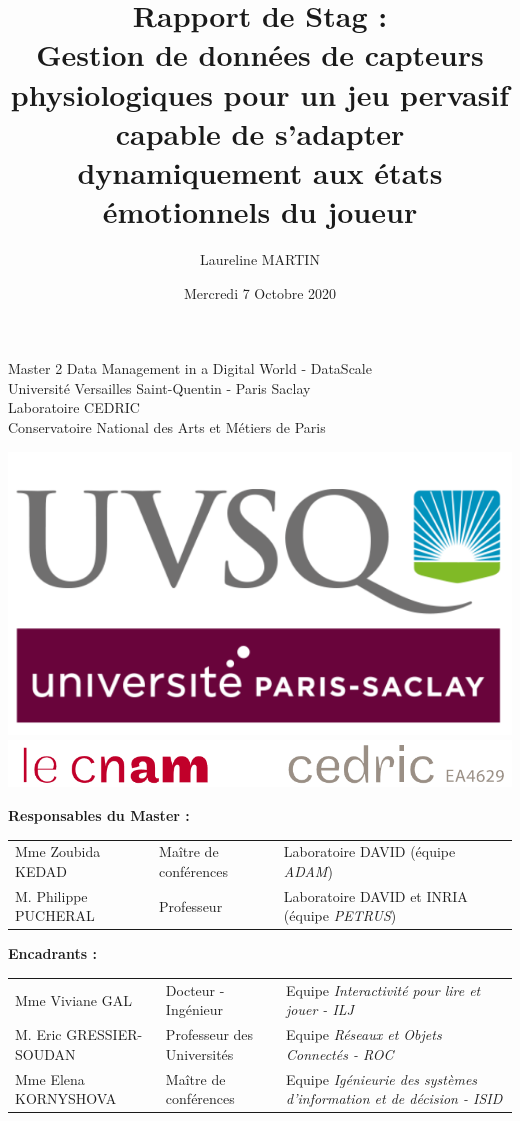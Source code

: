 \documentclass[11pt]{article}
\title{\textbf{Rapport de Stag :\\ Gestion de données de capteurs physiologiques pour un jeu pervasif capable de s'adapter dynamiquement aux états émotionnels du joueur}}
\author{Laureline MARTIN}
\date{Mercredi 7 Octobre 2020}
\begin{document}
\maketitle
\begin{center}
	\Large{Master 2 Data Management in a Digital World - DataScale\\ 
		Université Versailles Saint-Quentin - Paris Saclay\bigskip\\
		Laboratoire CEDRIC\\ 
		Conservatoire National des Arts et Métiers de Paris}
\end{center}
\vfill
\begin{center}
	\includegraphics[scale=0.25]{../include/uvsq.png}
	\includegraphics[scale=0.56]{../include/logo-cedric.PNG}\\
\end{center}
\vfill
\begin{center}
	\textbf{Responsables du Master :}
\end{center}
\begin{tabular}{p{4cm}p{4.5cm}p{7.5cm}}
	\hspace*{-1cm}
	Mme Zoubida KEDAD & Maître de conférences & Laboratoire DAVID (équipe \textit{ADAM})\\
	\hspace*{-1cm}
	M. Philippe PUCHERAL & Professeur & Laboratoire DAVID et INRIA (équipe \textit{PETRUS})
\end{tabular}\par
\begin{center}
	\textbf{Encadrants :}
\end{center}
\begin{tabular}{lp{4.5cm}p{7.5cm}}
	\hspace*{-1cm}
	Mme Viviane GAL & Docteur - Ingénieur & Equipe \textit{Interactivité pour lire et jouer - ILJ}\\
	\hspace*{-1cm}
	M. Eric GRESSIER-SOUDAN & Professeur des Universités & Equipe \textit{Réseaux et Objets Connectés - ROC}\\
	\hspace*{-1cm}
	Mme Elena KORNYSHOVA & Maître de conférences & Equipe \textit{Igénieurie des systèmes d'information et de décision - ISID}
\end{tabular}
\end{document}
